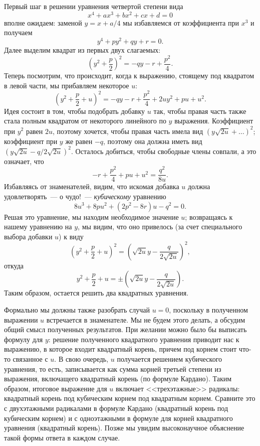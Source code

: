 \documentclass[a4paper,11pt]{scrartcl}
\theoremstyle{plain}
\theoremstyle{definition}
\begin{document}
Первый шаг в решении уравнения четвертой степени вида
$$
x^4 + ax^3 + bx^2 + cx + d = 0
$$
вполне ожидаем: заменой $y = x + a/4$ мы избавляемся от коэффициента
при $x^3$ и получаем
$$
y^4 + py^2 + qy + r = 0.
$$
Далее выделим квадрат из первых двух слагаемых:
$$
\left(y^2 + \frac{p}{2}\right)^2 = -qy -r + \frac{p^2}{4}.
$$
Теперь посмотрим, что происходит, когда к выражению, стоящему под
квадратом в левой части, мы прибавляем некоторое $u$:
$$
\left(y^2 + \frac{p}{2} + u\right)^2 = -qy -r + \frac{p^2}{4} + 2uy^2
+ pu + u^2.
$$
Идея состоит в том, чтобы подобрать добавку $u$ так, чтобы правая
часть также стала полным квадратом от некоторого линейного по $y$
выражения. Коэффициент при $y^2$ равен $2u$, поэтому хочется, чтобы
правая часть имела вид $(y\sqrt{2u} + \dots)^2$; коэффициент при $y$
же равен $-q$, поэтому она должна иметь вид
$(y\sqrt{2u} - q/2\sqrt{2u})^2$. Осталось добиться, чтобы свободные
члены совпали, а это означает, что
$$
-r + \frac{p^2}{4} + pu + u^2 = \frac{q^2}{8u}.
$$
Избавляясь от знаменателей, видим, что искомая добавка $u$ должна
удовлетворять~--- о чудо!~--- {\em кубическому} уравнению
$$
8u^3 + 8pu^2 + (2p^2-8r)u - q^2 = 0.
$$
Решая это уравнение, мы находим необходимое значение $u$;
возвращаясь к нашему уравнению на $y$, мы видим, что оно привелось 
(за счет специального выбора добавки $u$) к виду
$$
\left(y^2 + \frac{p}{2} + u\right)^2 = \left(\sqrt{2u}y -
\frac{q}{2\sqrt{2u}}\right)^2,
$$
откуда
$$
y^2 + \frac{p}{2} + u =
\pm \left(\sqrt{2u}y -\frac{q}{2\sqrt{2u}}\right).
$$
Таким образом, остается решить два квадратных уравнения.

Формально мы должны также разобрать случай $u=0$, поскольку в
полученном выражении $u$ встречается в знаменателе.
Мы не будем этого делать, а обсудим общий смысл полученных
результатов.
При желании можно было бы выписать формулу для $y$: решение
полученного квадратного уравнения приводит нас к выражению, в которое
входит квадратный корень, причем под корнем стоит что-то связанное с
$u$. В свою очередь, $u$ получается решением кубического уравнения, то
есть, записывается как сумма корней третьей степени из выражения,
включащего квадратный корень (по формуле Кардано). Таким образом,
итоговое выражение для $u$ включает <<трехэтажные>> радикалы:
квадратный корень под кубическим корнем под квадратным корнем.
Сравните это с двухэтажными радикалами в формуле Кардано (квадратный
корень под кубическим корнем) и с одноэтажными в формуле для корней
квадратного уравнения (квадратный корень). Позже мы увидим
высоконаучное объяснение такой формы ответа в каждом случае.
\end{document}
